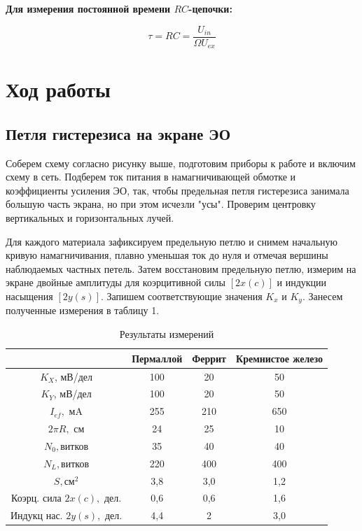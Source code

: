 \documentclass[a4paper, 14pt]{extarticle}
\begin{document}
\textbf{Для измерения постоянной времени $RC$-цепочки:}

\begin{equation}\label{}
    \tau=RC=\frac{U_{in}}{\Omega U_{ex}}
\end{equation}


\bigskip


\section{Ход работы}

\subsection{Петля гистерезиса на экране ЭО}


Соберем схему согласно рисунку выше, подготовим приборы к работе и включим схему в сеть. Подберем ток питания в намагничивающей обмотке и коэффициенты усиления ЭО, так, чтобы предельная петля гистерезиса занимала большую часть экрана, но при этом исчезли "усы". Проверим центровку вертикальных и горизонтальных лучей.

Для каждого материала зафиксируем предельную петлю и снимем начальную кривую намагничивания, плавно уменьшая ток до нуля и отмечая вершины наблюдаемых частных петель. Затем восстановим предельную петлю, измерим на экране двойные амплитуды для коэрцитивной силы $[2x(c)]$ и индукции насыщения $[2y(s)]$. Запишем соответствующие значения $K_x$ и $K_y$. Занесем полученные измерения в таблицу 1.

\begin{table}[h!]
	\centering
	\caption{Результаты измерений}
    \begin{tabular}{|c|c|c|c|}
	\hline 
	 & Пермаллой & Феррит & Кремнистое железо \\ 
	 \hline 
	$K_X$, мВ/дел & 100 & 20 & 50 \\
    \hline
	$K_Y$, мВ/дел & 100 & 20 & 50 \\ 
	\hline
	$I_{ef},$ мA & 255 & 210 & 650 \\ 
	\hline
	$2\pi R,$ см & 24 & 25 & 10 \\ 
	\hline
	$N_0,$витков & 35 & 40 & 40 \\ 
	\hline
	$N_L,$витков & 220 & 400 & 400 \\ 
	\hline
	$S,{см}^2$ & 3,8 & 3,0 & 1,2 \\ 
	\hline
	Коэрц. сила $2x(c),$ дел. & 0,6 & 0,6 & 1,6 \\ 
	\hline
	Индукц нас. $2y(s),$ дел. & 4,4 & 2 & 3,0 \\	
	\hline
	\end{tabular}%
\label{resT}%
\end{table}%
\end{document}
